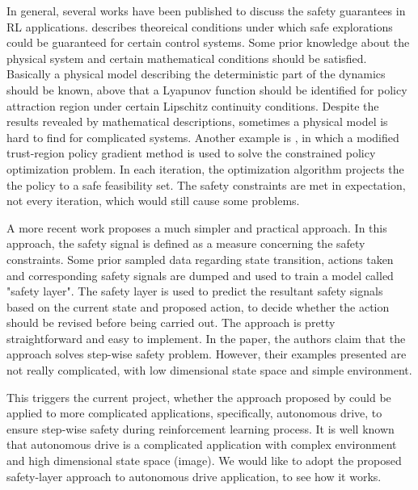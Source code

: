 \documentclass{article} %
\begin{document}
In general, several works have been published to discuss the safety guarantees in RL applications. \cite{berkenkamp2017safe} describes theoreical conditions under which safe explorations could be guaranteed for certain control systems. Some prior knowledge about the physical system and certain mathematical conditions should be satisfied. Basically a physical model describing the deterministic part of the dynamics should be known, above that a Lyapunov function should be identified for policy attraction region under certain Lipschitz continuity conditions. Despite the results revealed by mathematical descriptions, sometimes a physical model is hard to find for complicated systems. Another example is \cite{achiam2017constrained}, in which a modified trust-region policy gradient method is used to solve the constrained policy optimization problem. In each iteration, the optimization algorithm projects the the policy to a safe feasibility set. The safety constraints are met in expectation, not every iteration, which would still cause some problems. 

A more recent work \cite{dalal2018safe} proposes a much simpler and practical approach. In this approach, the safety signal is defined as a measure concerning the safety constraints. Some prior sampled data regarding state transition, actions taken and corresponding safety signals are dumped and used to train a model called "safety layer". The safety layer is used to predict the resultant safety signals based on the current state and proposed action, to decide whether the action should be revised before being carried out. The approach is pretty straightforward and easy to implement. In the paper, the authors claim that the approach solves step-wise safety problem. However, their examples presented are not really complicated, with low dimensional state space and simple environment. 

This triggers the current project, whether the approach proposed by \cite{dalal2018safe} could be applied to more complicated applications, specifically, autonomous drive, to ensure step-wise safety during reinforcement learning process. It is well known that autonomous drive is a complicated application with complex environment and high dimensional state space (image). We would like to adopt the proposed safety-layer approach to autonomous drive application, to see how it works.

\end{document}
